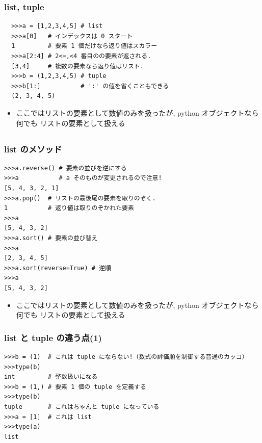 \begin{frame}[t,fragile]
 \frametitle{list, tuple}
 \begin{lstlisting}
  >>>a = [1,2,3,4,5] # list
  >>>a[0]   # インデックスは 0 スタート
  1         # 要素 1 個だけなら返り値はスカラー
  >>>a[2:4] # 2<=,<4 番目のの要素が返される. 
  [3,4]     # 複数の要素なら返り値はリスト. 
  >>>b = (1,2,3,4,5) # tuple
  >>>b[1:]           # ':' の値を省くこともできる
  (2, 3, 4, 5)
 \end{lstlisting}
 \begin{itemize}
  \item ここではリストの要素として数値のみを扱ったが, python オブジェクトなら何でも リストの要素として扱える
 \end{itemize}
\end{frame}

\subsection*{\redm\whitem\greenb}

\begin{frame}[t,fragile]
\frametitle{list のメソッド}
\begin{lstlisting}
>>>a.reverse() # 要素の並びを逆にする
>>>a           # a そのものが変更されるので注意!
[5, 4, 3, 2, 1]
>>>a.pop()  # リストの最後尾の要素を取りのぞく.
1           # 返り値は取りのぞかれた要素
>>>a
[5, 4, 3, 2]
>>>a.sort() # 要素の並び替え
>>>a
[2, 3, 4, 5]
>>>a.sort(reverse=True) # 逆順
>>>a
[5, 4, 3, 2]
\end{lstlisting}
\begin{itemize}
\item ここではリストの要素として数値のみを扱ったが, python オブジェクトなら何でも リストの要素として扱える
\end{itemize}
\end{frame}




\begin{frame}[t,fragile]
\frametitle{list と tuple の違う点(1)}
\begin{lstlisting}
>>>b = (1)  # これは tuple にならない!（数式の評価順を制御する普通のカッコ）
>>>type(b)
int         # 整数扱いになる
>>>b = (1,) # 要素 1 個の tuple を定義する
>>>type(b)
tuple       # これはちゃんと tuple になっている
>>>a = [1]  # これは list
>>>type(a)
list
\end{lstlisting}
\end{frame}

